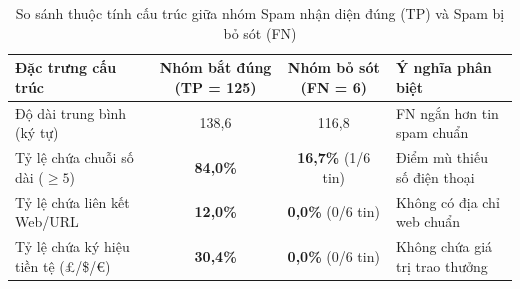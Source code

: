 \begin{table}[H]
\centering
\caption{So sánh thuộc tính cấu trúc giữa nhóm Spam nhận diện đúng (TP) và Spam bị bỏ sót (FN)}
\label{tab:so-sanh-tp-fn}
\begin{tabular}{|l|c|c|l|}
\hline
\textbf{Đặc trưng cấu trúc} & \textbf{Nhóm bắt đúng (TP = 125)} & \textbf{Nhóm bỏ sót (FN = 6)} & \textbf{Ý nghĩa phân biệt} \\
\hline
Độ dài trung bình (ký tự) & 138,6 & 116,8 & FN ngắn hơn tin spam chuẩn \\
\hline
Tỷ lệ chứa chuỗi số dài ($\ge 5$) & \textbf{84,0\%} & \textbf{16,7\%} (1/6 tin) & Điểm mù thiếu số điện thoại \\
\hline
Tỷ lệ chứa liên kết Web/URL & \textbf{12,0\%} & \textbf{0,0\%} (0/6 tin) & Không có địa chỉ web chuẩn \\
\hline
Tỷ lệ chứa ký hiệu tiền tệ (£/\$/€) & \textbf{30,4\%} & \textbf{0,0\%} (0/6 tin) & Không chứa giá trị trao thưởng \\
\hline
\end{tabular}
\end{table}

